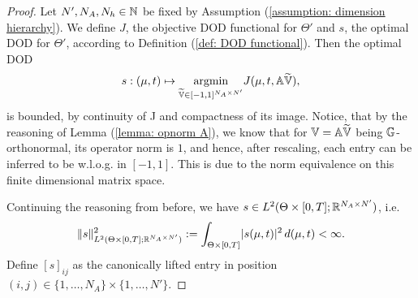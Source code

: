 \begin{proof}
    Let $N', N_A, N_h \in \mathbb{N}$ be fixed by Assumption (\ref{assumption: dimension hierarchy}). 
    We define $J$, the objective DOD functional for $\Theta'$ and $s$, the
    optimal DOD for $\Theta'$, according to Definition (\ref{def: DOD functional}). Then the optimal DOD
    \begin{equation*}
        s: (\mu, t) \mapsto \underset{{\widetilde{\mathbb{V}} \in [-1, 1]^{N_A \times N'}}}{\text{argmin}}  J(\mu, t, \mathbb{A} \widetilde{\mathbb{V}}),
    \end{equation*}
    is bounded, by continuity of J and compactness of its image. Notice, that by the reasoning of
    Lemma (\ref{lemma: opnorm A}), we know that for $\mathbb{V} = \mathbb{A} \widetilde{\mathbb{V}}$ being $\mathbb{G}$-orthonormal, its operator
    norm is $1$, and hence, after rescaling, each entry can be inferred to be w.l.o.g. in $[-1, 1]$. This is
    due to the norm equivalence on this finite dimensional matrix space. 
    
    Continuing the reasoning from before, we have 
    $s \in L^2(\Theta \times [0, T]; \mathbb{R}^{N_A \times N'})$, i.e.
    \begin{equation*}
        \lVert s \rVert^2_{L^2(\Theta \times [0, T]; \mathbb{R}^{N_A \times N'})} := 
        \int_{\Theta \times [0, T]} \lvert s(\mu, t) \rvert^2 \, d(\mu, t)  < \infty.
    \end{equation*}
    Define $[s]_{ij}$ as the canonically lifted
    entry in position $(i, j) \in \{1, \dots, N_A\} \times \{1, \dots, N'\}$.


\end{proof}
